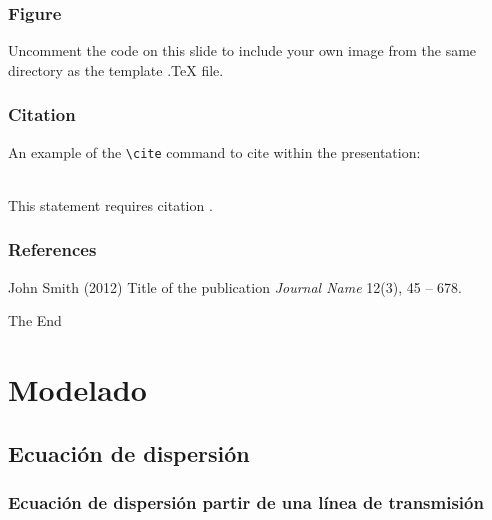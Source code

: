 \documentclass{beamer}
\begin{document}

\begin{frame}
\frametitle{Figure}
Uncomment the code on this slide to include your own image from the same directory as the template .TeX file.
\end{frame}


\begin{frame}[fragile] %
\frametitle{Citation}
An example of the \verb|\cite| command to cite within the presentation:\\~

This statement requires citation \cite{p1}.
\end{frame}


\begin{frame}
\frametitle{References}
\footnotesize{
\begin{thebibliography}{99} %
 John Smith (2012)
\newblock Title of the publication
\newblock \emph{Journal Name} 12(3), 45 -- 678.
\end{thebibliography}
}
\end{frame}


\begin{frame}
\Huge{\centerline{The End}}
\end{frame}


\section{Modelado}

	\subsection{Ecuación de dispersión}
		\begin{frame} %
		\frametitle{Ecuación de dispersión partir de una línea de transmisión}
		\end{frame}
	 
\end{document}
